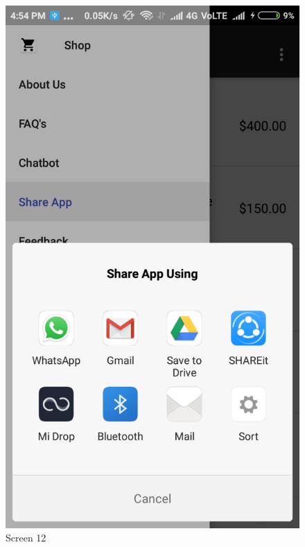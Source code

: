 \begin{figure}[ht]
\centering
\includegraphics[scale=0.30]{images/14.png}
\caption{Screen 12}
\end{figure}

\newpage

